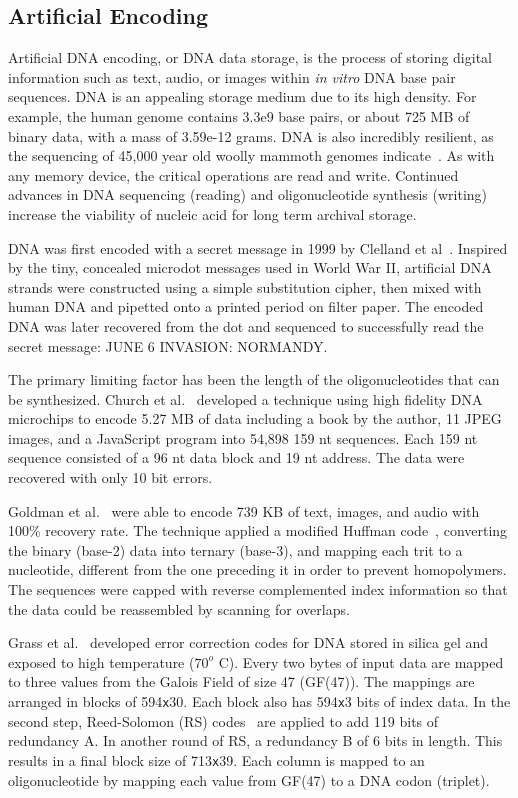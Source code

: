 \documentclass{bioinfo}
\begin{document}
\subsection{Artificial Encoding}

Artificial DNA encoding, or DNA data storage, is the process of storing digital information such as text, audio, or images within \textit{in vitro} DNA base pair sequences. DNA is an appealing storage medium due to its high density. For example, the human genome contains 3.3e9 base pairs, or about 725 MB of binary data, with a mass of 3.59e-12 grams. DNA is also incredibly resilient, as the sequencing of 45,000 year old woolly mammoth genomes indicate~\cite{PALKOPOULOU2015}. As with any memory device, the critical operations are read and write. Continued advances in DNA sequencing (reading) and oligonucleotide synthesis (writing) increase the viability of nucleic acid for long term archival storage.

DNA was first encoded with a secret message in 1999 by Clelland et al~\cite{CRB1999N}. Inspired by the tiny, concealed microdot messages used in World War II, artificial DNA strands were constructed using a simple substitution cipher, then mixed with human DNA and pipetted onto a printed period on filter paper. The encoded DNA was later recovered from the dot and sequenced to successfully read the secret message: JUNE 6 INVASION: NORMANDY.

The primary limiting factor has been the length of the oligonucleotides that can be synthesized. Church et al.~\cite{CHURCH2012} developed a technique using high fidelity DNA microchips to encode 5.27 MB of data including a book by the author, 11 JPEG images, and a JavaScript program into 54,898 159 nt sequences. Each 159 nt sequence consisted of a 96 nt data block and 19 nt address. The data were recovered with only 10 bit errors.

Goldman et al.~\cite{GOLDMAN2013} were able to encode 739 KB of text, images, and audio with 100\% recovery rate. The technique applied a modified Huffman code~\cite{H1952POTIRE}, converting the binary (base-2) data into ternary (base-3), and mapping each trit to a nucleotide, different from the one preceding it in order to prevent homopolymers. The sequences were capped with reverse complemented index information so that the data could be reassembled by scanning for overlaps.

Grass et al.~\cite{GRASS2015} developed error correction codes for DNA stored in silica gel and exposed to high temperature ($70^o$ C). Every two bytes of input data are mapped to three values from the Galois Field of size 47 (GF(47)). The mappings are arranged in blocks of 594\texttt{x}30. Each block also has 594\texttt{x}3 bits of index data. In the second step, Reed-Solomon (RS) codes~\cite{REED1960} are applied to add 119 bits of redundancy A. In another round of RS, a redundancy B of 6 bits in length. This results in a final block size of 713\texttt{x}39. Each column is mapped to an oligonucleotide by mapping each value from GF(47) to a DNA codon (triplet).
\end{document}
